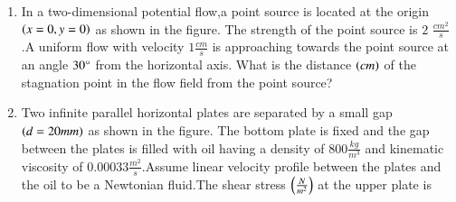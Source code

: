 \documentclass[journal]{IEEEtran}
\begin{document}
\begin{enumerate}[start=14]
    \item In a two-dimensional potential flow,a point source is located at the origin $\left(x=0,y=0\right)$ as shown in the figure. The strength of the point source is $2$ $\frac{cm^2}{s}$.A uniform flow with velocity $1$$\frac{cm}{s}$ is approaching towards the point source at an angle $30\degree$ from the horizontal axis. What is the distance $\left(cm\right)$ of the stagnation point in the flow field from the point source?
    \item Two infinite parallel horizontal plates are separated by a small gap $\left(d=20mm\right)$ as shown in the figure. The bottom plate is fixed and the gap between the plates is filled with oil having a density of $800$$\frac{kg}{m^3}$ and kinematic viscosity of $0.00033$$\frac{m^2}{s}$.Assume linear velocity profile between the plates and the oil  to be a Newtonian fluid.The shear stress $\left(\frac{N}{m^2}\right)$ at the upper plate is\\ 
\end{enumerate}
\end{document}

